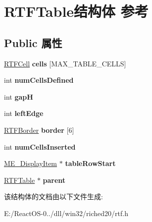 \hypertarget{struct_r_t_f_table}{}\section{R\+T\+F\+Table结构体 参考}
\label{struct_r_t_f_table}
\subsection*{Public 属性}
\begin{DoxyCompactItemize}
\item 
\mbox{\label{struct_r_t_f_table_a117d00e2bcce193c396c6d475e54a1ba}} 
\hyperlink{struct_r_t_f_cell}{R\+T\+F\+Cell} {\bfseries cells} \mbox{[}M\+A\+X\+\_\+\+T\+A\+B\+L\+E\+\_\+\+C\+E\+L\+LS\mbox{]}
\item 
\mbox{\label{struct_r_t_f_table_a5e4d9abba08d9d6fc1be52fb5f26e37b}} 
int {\bfseries num\+Cells\+Defined}
\item 
\mbox{\label{struct_r_t_f_table_a8d7b2e9af00fbbf6c7e507ceca2f760a}} 
int {\bfseries gapH}
\item 
\mbox{\label{struct_r_t_f_table_a943c40724c16b29b2cde8599fa37bdb2}} 
int {\bfseries left\+Edge}
\item 
\mbox{\label{struct_r_t_f_table_a91df717ea12d8e9a2ccb2beb2febe05c}} 
\hyperlink{struct_r_t_f_border}{R\+T\+F\+Border} {\bfseries border} \mbox{[}6\mbox{]}
\item 
\mbox{\label{struct_r_t_f_table_ad606d758357daf8641eb51a962c0eed9}} 
int {\bfseries num\+Cells\+Inserted}
\item 
\mbox{\label{struct_r_t_f_table_a805c533ac6c08271101164c9d8a670bf}} 
\hyperlink{structtag_m_e___display_item}{M\+E\+\_\+\+Display\+Item} $\ast$ {\bfseries table\+Row\+Start}
\item 
\mbox{\label{struct_r_t_f_table_ac2f197a3c8a84623efac2795f3cd525e}} 
\hyperlink{struct_r_t_f_table}{R\+T\+F\+Table} $\ast$ {\bfseries parent}
\end{DoxyCompactItemize}


该结构体的文档由以下文件生成\+:\begin{DoxyCompactItemize}
\item 
E\+:/\+React\+O\+S-\/0../dll/win32/riched20/rtf.\+h\end{DoxyCompactItemize}
